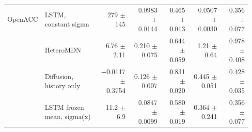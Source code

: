 \begin{table}[htbp]
\begin{tabular}{llrrrrr}
\midrule
OpenACC & LSTM, constant sigma & 279 $\pm$ 145 & 0.0983 $\pm$ 0.0144 & 0.465 $\pm$ 0.013 & 0.0507 $\pm$ 0.0030 & 0.356 $\pm$ 0.077 \\
 & HeteroMDN & 6.76 $\pm$ 2.11 & 0.210 $\pm$ 0.075 & 0.644 $\pm$ 0.059 & 1.21 $\pm$ 0.64 & 0.978 $\pm$ 0.408 \\
 & Diffusion, history only & $-$0.0117 $\pm$ 0.3754 & 0.126 $\pm$ 0.007 & 0.831 $\pm$ 0.020 & 0.445 $\pm$ 0.051 & 0.428 $\pm$ 0.035 \\
 & LSTM frozen mean, sigma(x) & 11.2 $\pm$ 6.9 & 0.0847 $\pm$ 0.0099 & 0.580 $\pm$ 0.019 & 0.364 $\pm$ 0.241 & 0.356 $\pm$ 0.077 \\
\bottomrule
\end{tabular}
\end{table}
